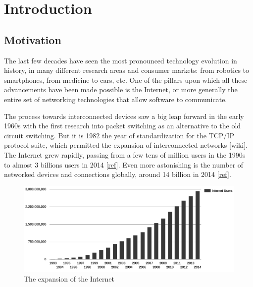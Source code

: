 \chapter{Introduction}
\label{chap:introduction}

\section{Motivation}
The last few decades have seen the most pronounced technology evolution in history, in many different research areas and consumer markets: from robotics to smartphones, from medicine to cars, etc. One of the pillars upon which all these advancements have been made possible is the Internet, or more generally the entire set of networking technologies that allow software to communicate. 


The process towards interconnected devices saw a big leap forward in the early 1960s with the first research into packet switching as an alternative to the old circuit switching. But it is 1982 the year of standardization for the TCP/IP protocol suite, which permitted the expansion of interconnected networks  [wiki]. The Internet grew rapidly, passing from a few tens of million users in the 1990s to almost 3 billions users in 2014 [\href{http://www.internetlivestats.com/internet-users}{ref}]. Even more astonishing is the number of networked devices and connections globally, around 14 billion in 2014 [\href{http://www.cisco.com/c/en/us/solutions/service-provider/visual-networking-index-vni/index.html#~complete-forecast}{ref}].

\begin{figure}[!htb]
\centering
\includegraphics[width=\textwidth]{images/internet_growth}
\caption{The expansion of the Internet}
\label{fig:internet_growth}
\end{figure}

